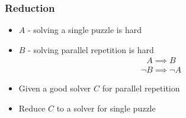 \documentclass[first,firstsupp,notes, handout, last]{ETHclass}
\begin{document}
\begin{frame}[t]
\frametitle{Reduction}
\begin{itemize}
  \item $A$ - solving a single puzzle is hard
  \item $B$ - solving parallel repetition is hard
    \begin{align*}
      A \implies B
    \end{align*}
      \begin{align*}
        \lnot B \implies \lnot A
      \end{align*}
  \item Given a good solver $C$ for parallel repetition
  \item Reduce $C$ to a solver for single puzzle
\end{itemize}
\end{frame}

\end{document}
